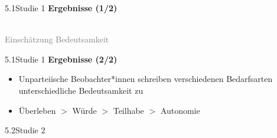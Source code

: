 \documentclass[xcolor=table,9pt,aspectratio=169]{beamer}
\begin{document}
\begin{frame}{\vspace*{10mm}5.1\hspace*{1em}Studie 1}
\textbf{Ergebnisse (1/2)}\\
\medskip
\begin{center}
   \\
   \textcolor{gray}{Einschätzung Bedeutsamkeit}
\end{center}
\end{frame}


\begin{frame}{\vspace*{10mm}5.1\hspace*{1em}Studie 1}
\textbf{Ergebnisse (2/2)}\\
\medskip
\begin{itemize}
   \item Unparteiische Beobachter*innen schreiben verschiedenen Bedarfsarten unterschiedliche Bedeutsamkeit zu
   \item Überleben $>$ Würde $>$ Teilhabe $>$ Autonomie
\end{itemize}
\end{frame}


\begin{frame}
\begin{overlayarea}{\textwidth}{0.81\paperheight}{
   \vspace*{11mm}
   \textcolor{uolblue}
   {5.2\hspace*{1em}Studie 2}
}
\end{overlayarea}
\end{frame}
\end{document}
